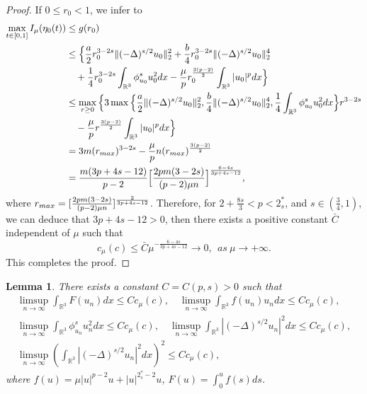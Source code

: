 \documentclass[11pt]{article}
\numberwithin{equation}{section}
\newtheorem{lemma}[theorem]{Lemma}
\begin{document}
\begin{proof}
If $0 \leq r_0<1$, we infer to
\begin{align*}
\max_{t\in[0,1]} I_\mu(\eta_0(t))&\leq  g(r_0)\\
&\leq  \Big\{\frac{a}{2}r^{3-2s}_0\|(-\Delta)^{s/2}u_0\|^2_2
 +\frac{b}{4}r^{3-2s}_0\|(-\Delta)^{s/2}u_0\|^4_2\\
&\quad +\frac{1}{4}r^{3-2s}_0\int_{\mathbb{R}^3}\phi^s_{u_0}u^2_0dx
 -\frac{\mu}{p}r^{\frac{3(p-2)}{2}}_0\int_{\mathbb{R}^3}|u_0|^pdx\Big\}\\
&\leq  \max_{r\geq 0}\Big\{3\max\Big\{\frac{a}{2}\|(-\Delta)^{s/2}u_0\|^2_2, 
 \frac{b}{4}\|(-\Delta)^{s/2}u_0\|^4_2,
\frac{1}{4}\int_{\mathbb{R}^3}\phi^s_{u_0}u^2_0dx  \Big\}r^{3-2s}\\
&\quad -\frac{\mu}{p}r^{\frac{3(p-2)}{2}}\int_{\mathbb{R}^3}|u_0|^pdx\Big\}\\
&= 3m(r_{\rm max})^{3-2s}-\frac{\mu}{p}n(r_{\rm max})^{\frac{3(p-2)}{2}}\\
&= \frac{m(3p+4s-12)}{p-2}\Big[\frac{2pm(3-2s)}{(p-2)\mu n}\Big]^{\frac{6-4s}{3p+4s-12}},
\end{align*}
where $r_{\rm max}=[\frac{2pm(3-2s)}{(p-2)\mu n}]^{\frac{2}{3p+4s-12}}$.
Therefore, for $2+\frac{8s}{3}<p<2^*_s$, and $s\in{(\frac{3}{4}, 1)}$, we can deduce 
that $3p+4s-12>0$, then there exists a positive constant $\bar{C}$ independent of
 $\mu$ such that
$$
c_\mu (c)\leq \bar{C}{\mu}^{-\frac{6-4s}{3p+4s-12}}\to 0, ~~as~\mu\to +\infty.
$$
This completes the proof.
\end{proof}

\begin{lemma}\label{lem5.8} 
There exists  a constant $C=C(p,s)>0$ such that
\begin{gather*}
\limsup_{n\to \infty} \int_{\mathbb{R}^3}F(u_n)dx\leq C c_\mu(c), \quad
\limsup_{n\to \infty} \int_{\mathbb{R}^3}f(u_n){u_n}dx\leq C c_\mu(c), \\
\limsup_{n\to \infty} \int_{\mathbb{R}^3}\phi^s_{u_n}u^2_ndx\leq C c_\mu(c),\quad 
\limsup_{n\to \infty} \int_{\mathbb{R}^3}|(-\Delta)^{s/2}u_n|^2dx\leq C c_\mu(c),\\
\limsup_{n\to \infty} (\int_{\mathbb{R}^3}|(-\Delta)^{s/2}u_n|^2dx)^2\leq C c_\mu(c),
\end{gather*}
where $f(u)=\mu|u|^{p-2}u+|u|^{2^*_s-2}u$, $F(u)=\int^u_0 f(s)ds$.
\end{lemma}
\end{document}
